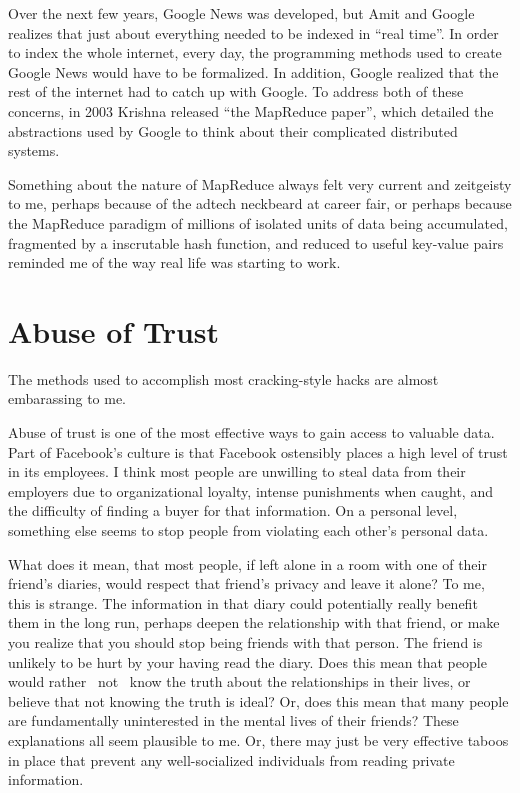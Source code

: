 \documentclass[12pt]{article}
\begin{document}
Over the next few years, Google News was developed, but Amit and Google
realizes that just about everything needed to be indexed in ``real time''.
In order to index the whole internet, every day, the programming methods
used to create Google News would have to be formalized.  In addition,
Google realized that the rest of the internet had to catch up with
Google.  To address both of these concerns, in 2003 Krishna released
``the MapReduce paper'', which detailed the abstractions used by Google to
think about their complicated distributed systems.  

Something about the nature of MapReduce always felt very current and
zeitgeisty to me, perhaps because of the adtech neckbeard at career
fair, or perhaps because the MapReduce paradigm of millions of isolated
units of data being accumulated, fragmented by a inscrutable hash
function, and reduced to useful key-value pairs reminded me of the way
real life was starting to work.

\section{Abuse of Trust}
The methods used to accomplish most cracking-style hacks are almost
embarassing to me. 

Abuse of trust is one of the most effective ways to gain access to valuable
data.  Part of Facebook's culture is that Facebook ostensibly places a high
level of trust in its employees.  I think most people are unwilling to steal
data from their employers due to organizational loyalty, intense punishments
when caught, and the difficulty of finding a buyer for that information.  On a
personal level, something else seems to stop people from violating each other's
personal data.

What does it mean, that most people, if left alone in a room with one of their
friend's diaries, would respect that friend's privacy and leave it alone?  To
me, this is strange.  The information in that diary could potentially really
benefit them in the long run, perhaps deepen the relationship with that friend,
or make you realize that you should stop being friends with that person.  The
friend is unlikely to be hurt by your having read the diary.  Does this mean
that people would rather ~not~ know the truth about the relationships in their
lives, or believe that not knowing the truth is ideal?  Or, does this mean that
many people are fundamentally uninterested in the mental lives of their friends?
These explanations all seem plausible to me.  Or, there may just be very
effective taboos in place that prevent any well-socialized individuals from
reading private information.
\end{document}
